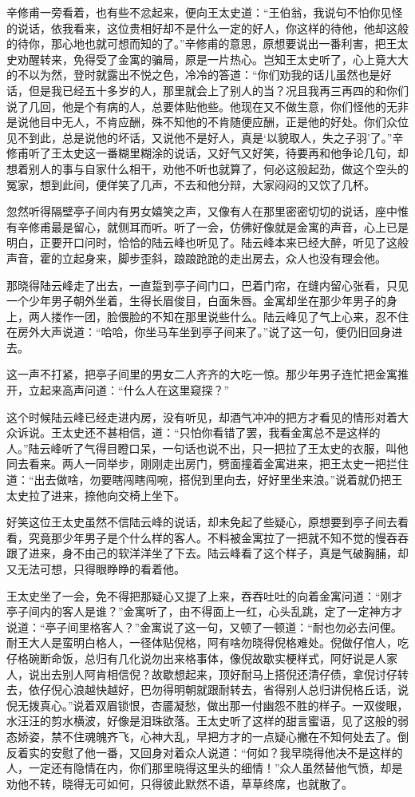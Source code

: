 \documentclass[12pt,UTF8]{ctexbook}
\begin{document}
{{{辛修甫一旁看着，也有些不忿起来，便向王太史道：“王伯翁，我说句不怕你见怪的说话，依我看来，这位贵相好却不是什么一定的好人，你这样的待他，他却这般的待你，那心地也就可想而知的了。”辛修甫的意思，原想要说出一番利害，把王太史劝醒转来，免得受了金寓的骗局，原是一片热心。岂知王太史听了，心上竟大大的不以为然，登时就露出不悦之色，冷冷的答道：“你们劝我的话儿虽然也是好话，但是我已经五十多岁的人，那里就会上了别人的当？况且我再三再四的和你们说了几回，他是个有病的人，总要体贴他些。他现在又不做生意，你们怪他的无非是说他目中无人，不肯应酬，殊不知他的不肯随便应酬，正是他的好处。你们众位见不到此，总是说他的坏话，又说他不是好人，真是‘以貌取人，失之子羽’了。”辛修甫听了王太史这一番糊里糊涂的说话，又好气又好笑，待要再和他争论几句，却想着别人的事与自家什么相干，劝他不听也就算了，何必这般起劲，做这个空头的冤家，想到此间，便佯笑了几声，不去和他分辩，大家闷闷的又饮了几杯。

忽然听得隔壁亭子间内有男女嬉笑之声，又像有人在那里密密切切的说话，座中惟有辛修甫最是留心，就侧耳而听。听了一会，仿佛好像就是金寓的声音，心上已是明白，正要开口问时，恰恰的陆云峰也听见了。陆云峰本来已经大醉，听见了这般声音，霍的立起身来，脚步歪斜，踉踉跄跄的走出房去，众人也没有理会他。

那晓得陆云峰走了出去，一直踅到亭子间门口，巴着门帘，在缝内留心张看，只见一个少年男子朝外坐着，生得长眉俊目，白面朱唇。金寓却坐在那少年男子的身上，两人搂作一团，脸偎脸的不知在那里说些什么。陆云峰见了气上心来，忍不住在房外大声说道：“哈哈，你坐马车坐到亭子间来了。”说了这一句，便仍旧回身进去。

这一声不打紧，把亭子间里的男女二人齐齐的大吃一惊。那少年男子连忙把金寓推开，立起来高声问道：“什么人在这里窥探？”

这个时候陆云峰已经走进内房，没有听见，却酒气冲冲的把方才看见的情形对着大众诉说。王太史还不甚相信，道：“只怕你看错了罢，我看金寓总不是这样的人。”陆云峰听了气得目瞪口呆，一句话也说不出，只一把拉了王太史的衣服，叫他同去看来。两人一同举步，刚刚走出房门，劈面撞着金寓进来，把王太史一把拦住道：“出去做啥，勿要瞎闯瞎闯啘，搭倪到里向去，好好里坐来浪。”说着就仍把王太史拉了进来，捺他向交椅上坐下。

好笑这位王太史虽然不信陆云峰的说话，却未免起了些疑心，原想要到亭子间去看看，究竟那少年男子是个什么样的客人。不料被金寓拉了一把就不知不觉的慢吞吞跟了进来，身不由己的软洋洋坐了下去。陆云峰看了这个样子，真是气破胸脯，却又无法可想，只得眼睁睁的看着他。

王太史坐了一会，免不得把那疑心又提了上来，吞吞吐吐的向着金寓问道：“刚才亭子间内的客人是谁？”金寓听了，由不得面上一红，心头乱跳，定了一定神方才说道：“亭子间里格客人？”金寓说了这一句，又顿了一顿道：“耐也勿必去问俚。耐王大人是蛮明白格人，一径体贴倪格，阿有啥勿晓得倪格难处。倪做仔倌人，吃仔格碗断命饭，总归有几化说勿出来格事体，像倪故歇实梗样式，阿好说是人家人，说出去别人阿肯相信倪？故歇想起来，顶好耐马上搭倪还清仔债，拿倪讨仔转去，依仔倪心浪越快越好，巴勿得明朝就跟耐转去，省得别人总归讲倪格丘话，说倪无拨真心。”说着双眉锁恨，杏靥凝愁，做出那一付幽怨不胜的样子。一双俊眼，水汪汪的剪水横波，好像是泪珠欲落。王太史听了这样的甜言蜜语，见了这般的弱态娇姿，禁不住魂魄齐飞，心神大乱，早把方才的一点疑心撇在不知何处去了。倒反着实的安慰了他一番，又回身对着众人说道：“何如？我早晓得他决不是这样的人，一定还有隐情在内，你们那里晓得这里头的细情！”众人虽然替他气愤，却是劝他不转，晓得无可如何，只得彼此默然不语，草草终席，也就散了。

}}}
\end{document}
